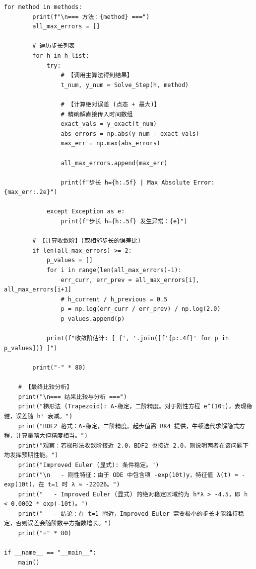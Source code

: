 \documentclass[UTF8,a4paper,11pt]{ctexart}                    %
\begin{document}
\begin{lstlisting}[style=python,caption={梯形方法、BDF2、改进Euler方法比较}]
    for method in methods:
        print(f"\n=== 方法：{method} ===")
        all_max_errors = []
        
        # 遍历步长列表
        for h in h_list:
            try:
                # 【调用主算法得到结果】
                t_num, y_num = Solve_Step(h, method)
                
                # 【计算绝对误差 (点态 + 最大)】
                # 精确解直接传入时间数组
                exact_vals = y_exact(t_num)
                abs_errors = np.abs(y_num - exact_vals)
                max_err = np.max(abs_errors)
                
                all_max_errors.append(max_err)
                
                print(f"步长 h={h:.5f} | Max Absolute Error: {max_err:.2e}")

            except Exception as e:
                print(f"步长 h={h:.5f} 发生异常：{e}")
        
        # 【计算收敛阶】(取相邻步长的误差比)
        if len(all_max_errors) >= 2:
            p_values = []
            for i in range(len(all_max_errors)-1):
                err_curr, err_prev = all_max_errors[i], all_max_errors[i+1]
                # h_current / h_previous = 0.5
                p = np.log(err_curr / err_prev) / np.log(2.0)
                p_values.append(p)
            
            print(f"收敛阶估计: [ {', '.join([f'{p:.4f}' for p in p_values])} ]")

        print("-" * 80)

    # 【最终比较分析】
    print("\n=== 结果比较与分析 ===")
    print("梯形法 (Trapezoid): A-稳定，二阶精度。对于刚性方程 e^(10t)，表现稳健，误差随 h² 衰减。")
    print("BDF2 格式：A-稳定，二阶精度。起步值需 RK4 提供，牛顿迭代求解隐式方程，计算量略大但精度相当。")
    print("观察：若梯形法收敛阶接近 2.0，BDF2 也接近 2.0，则说明两者在该问题下均发挥预期性能。")
    print("Improved Euler (显式): 条件稳定。")
    print("\n   - 刚性特征：由于 ODE 中包含项 -exp(10t)y，特征值 λ(t) ≈ -exp(10t)，在 t=1 时 λ ≈ -22026。")
    print("   - Improved Euler (显式) 的绝对稳定区域约为 h*λ > -4.5，即 h < 0.0002 * exp(-10t)。")
    print("   - 结论：在 t=1 附近，Improved Euler 需要极小的步长才能维持稳定，否则误差会随阶数平方指数增长。")
    print("=" * 80)

if __name__ == "__main__":
    main()
\end{lstlisting}
\end{document}

